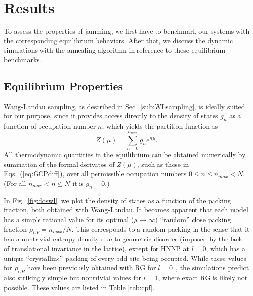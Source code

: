 \section{Results}
\label{sec:jam_results} 
To assess the properties of jamming, we first
have to benchmark our systems with the corresponding equilibrium behaviors.
After that, we discuss the dynamic simulations with the annealing
algorithm in reference to these equilibrium benchmarks.


\subsection{Equilibrium Properties\label{sub:Equilibrium-PropertiesWang-Landa}}

Wang-Landau sampling, as described in Sec.~\ref{sub:WLsampling},
is ideally suited for our purpose, since it provides access directly
to the density of states $g_{n}$ as a function of occupation number
$n$, which yields the partition function as
\begin{equation}
Z(\mu)=\sum_{n=0}^{n_{max}}g_{n}e^{n\mu}.\label{eq:Zmu}
\end{equation}
All thermodynamic quantities in the equilibrium can be obtained numerically
by summation of the formal derivates of $Z(\mu)$, such as those in
Eqs.~(\ref{eq:GCPdiff}), over all permissible occupation numbers
$0\leq n\leq n_{max}<N$. (For all $n_{max}<n\leq N$ it is $g_{n}=0$.) 

In Fig.~\ref{fig:doswl}, we plot the density of states as a function
of the packing fraction, both obtained with Wang-Landau. It becomes
apparent that each model has a simple rational value for its optimal
($\mu\to\infty$) ``random'' close packing fraction $\rho_{CP}=n_{max}/N$.
This corresponds to a random packing in the sense that it has a nontrivial
entropy density due to geometric disorder (imposed by the lack of
translational invariance in the lattice), except for HNNP at $l=0$,
which has a unique ``crystalline'' packing of every odd site being
occupied. While these values for $\rho_{CP}$ have been previously
obtained with RG for $l=0$~\cite{BoHa11}, the simulations predict
also strikingly simple but nontrivial values for $l=1$, where exact
RG is likely not possible. These values are listed in Table \ref{tab:cpf}.

